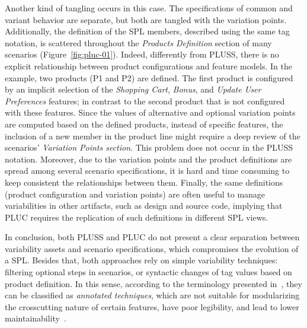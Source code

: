 Another kind of tangling occurs in this case. The specifications of common and
variant behavior are separate, but both are tangled with the variation points.
{\color{red}Additionally}, the definition of the SPL members, described using the
same tag notation,  {\color{red} is scattered throughout the \emph{Products
Definition} section of many scenarios (Figure~\ref{fig:pluc-01})}.
{\color{red} Indeed, differently from PLUSS}, there is no explicit
relationship between product configurations and feature models. In the example, two products (P1 and P2) are defined. The first product is configured by an implicit selection of the \emph{Shopping Cart}, \emph{Bonus}, and \emph{Update
User Preferences} features; in contrast to the second product that is not
configured with these features. Since the values of alternative and optional
variation points are computed based on the defined products, instead of specific
features, the inclusion of a new member in the product line might require a deep
review of the scenarios' \emph{Variation Points section}. {\color{red}This problem does not occur in the PLUSS notation}. Moreover, due to the
variation points and the product definitions are spread among several scenario
specifications, it is hard and time consuming to keep consistent the
relationships between them. Finally, the same definitions (product configuration
and variation points) are often useful to manage variabilities in other
artifacts, such as design and source code, implying that PLUC
requires the replication of such definitions in different SPL views.

In conclusion, both PLUSS and PLUC do not present a clear separation between
variability assets and scenario specifications, which compromises the
evolution of a SPL. Besides that, both approaches rely on simple
variability techniques: filtering optional steps in scenarios, or syntactic
changes of tag values based on product definition. In this sense, according to the terminology
presented in~\cite{Kastner:2008aa}, they can be classified as \emph{annotated
techniques}, which are not suitable for modularizing the crosscutting nature of certain
features, have poor legibility, and lead to lower
maintainability~\cite{Alves:2006aa,Kastner:2008aa}.




